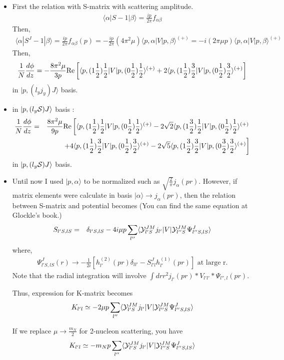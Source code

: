 \documentclass[10pt]{article}
\newcommand{\bea}{\begin{eqnarray}}
\newcommand{\eea}{\end{eqnarray}}
\newcommand{\no}{\nonumber \\}
\def\la{\langle}
\def\ra{\rangle}
\begin{document}
\begin{itemize}
\item 
First the relation with S-matrix with scattering amplitude.
\bea
\la \alpha|S-1|\beta\ra=\frac{ ip}{2\pi}f_{\alpha\beta}
\eea
Then,
\bea
\la \alpha|S^J-1|\beta\ra=\frac{ip}{2\pi} f_{\alpha\beta}(p)
=-\frac{ip}{2\pi}(4\pi^2\mu)\la p,\alpha|V|p,\beta\ra^{(+)}
=-i(2\pi \mu p)\la p,\alpha|V|p,\beta\ra^{(+)}
\eea
Then,
\bea
\frac{1}{N}\frac{d\phi}{dz}
=-\frac{8\pi^2\mu}{3p}{\rm Re}\left[
 \la p,(1\frac{1}{2})\frac{1}{2}|V|p,(0\frac{1}{2})\frac{1}{2}\ra^{(+)}
 +2 \la p,(1\frac{1}{2})\frac{3}{2}|V|p,(0\frac{1}{2})\frac{3}{2}\ra^{(+)}\right]
\eea
in $|p,(l_y j_y) J\ra$ basis.
\item in $|p,(l_y {\cal S}) J\ra$ basis :
\bea
\frac{1}{N}\frac{d\phi}{dz}
&=&\frac{8\pi^2\mu}{9p}{\rm Re}\left[
 \la p,(1\frac{1}{2})\frac{1}{2}|V|p,(0\frac{1}{2})\frac{1}{2}\ra^{(+)}
 -2\sqrt{2}\la p,(1\frac{3}{2})\frac{1}{2}|V|p,(0\frac{1}{2})\frac{1}{2}\ra^{(+)}
 \right.\no & &\left. 
 +4\la p,(1\frac{1}{2})\frac{3}{2}|V|p,(0\frac{1}{2})\frac{3}{2}\ra^{(+)}
 -2\sqrt{5}\la p,(1\frac{3}{2})\frac{3}{2}|V|p,(0\frac{3}{2})\frac{3}{2}\ra^{(+)}
 \right]
\eea
in $|p,(l_y {\cal S}) J\ra$ basis.

\item 
Until now I used $|p,\alpha\ra$ to be normalized such as
$\sqrt{\frac{2}{\pi}}j_\alpha(pr)$. However, if matrix elements
were calculate in basis $|\alpha\ra\to j_\alpha(pr)$, then
the relation between S-matrix and potential becomes
(You can find the same equation at Glockle's book.)
\bea
S_{l'S,lS}
&=&\delta_{l'S,lS}-4i \mu p\sum_{l''}
                   \la {\cal Y}^{JM}_{l'S} j_{l'}|V|
                   {\cal Y}^{JM}_{l'' S} \Psi_{l''S,lS}^J\ra
\eea
where, 
\bea
\Psi_{l'S,lS}^J(r)\to -\frac{1}{2i}[h^{(2)}_{l'}(pr)\delta_{ll'}
                      -S^J_{l'l} h^{(1)}_{l'}(pr)] 
                      \mbox{ at large r}.
\eea
Note that the radial integration will involve 
$\int dr r^2 j_{l'}(pr)*V_{l'l'}*\Psi_{l'',l}(pr)$.

Thus, expression for K-matrix becomes                   
\bea
K_{l' l}\simeq -2\mu p \sum_{l''} 
               \la {\cal Y}^{JM}_{l'S} j_{l'}|V|
                   {\cal Y}^{JM}_{l'' S} \Psi_{l''S,lS}^J\ra     
\eea

If we replace $\mu\to \frac{m_N}{2}$ for 
2-nucleon scattering, you have
\bea
K_{l'l}\simeq -m_N p \sum_{l''} 
               \la {\cal Y}^{JM}_{l'S} j_{l'}|V|
                   {\cal Y}^{JM}_{l'' S} \Psi_{l''S,lS}^J\ra     
\eea 


\end{itemize}
\end{document}
